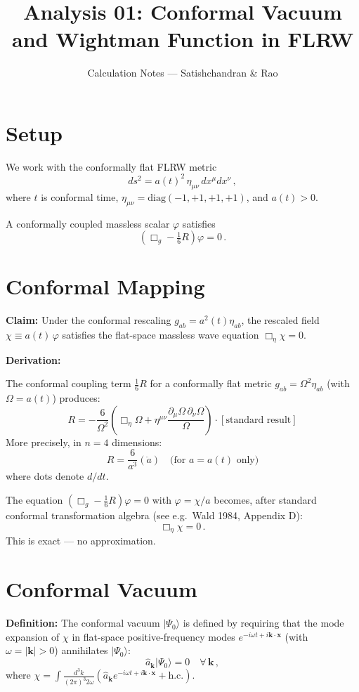 \documentclass[12pt]{article}
\title{Analysis 01: Conformal Vacuum and Wightman Function in FLRW}
\author{Calculation Notes --- Satishchandran \& Rao}
\date{}
\newcommand{\Scfac}{a}
\newcommand{\pd}{\partial}
\newcommand{\be}{\begin{equation}}
\newcommand{\ee}{\end{equation}}
\newcommand{\lb}{\left}
\newcommand{\rb}{\right}
\begin{document}
\maketitle

\section{Setup}

We work with the conformally flat FLRW metric
\be
  ds^2 = \Scfac(t)^2 \, \eta_{\mu\nu} \, dx^\mu dx^\nu \,,
\ee
where $t$ is conformal time, $\eta_{\mu\nu} = \mathrm{diag}(-1,+1,+1,+1)$,
and $\Scfac(t) > 0$.

A conformally coupled massless scalar $\varphi$ satisfies
\be
  \lb(\Box_g - \tfrac{1}{6} R\rb) \varphi = 0 \,.
\ee

\section{Conformal Mapping}

\textbf{Claim:} Under the conformal rescaling $g_{ab} = \Scfac^2(t) \eta_{ab}$,
the rescaled field $\chi \equiv \Scfac(t) \, \varphi$ satisfies the flat-space
massless wave equation $\Box_\eta \chi = 0$.

\textbf{Derivation:}

The conformal coupling term $\frac{1}{6}R$ for a conformally flat metric
$g_{ab} = \Omega^2 \eta_{ab}$ (with $\Omega = \Scfac(t)$) produces:
\be
  R = -\frac{6}{\Omega^2} \lb(\Box_\eta \Omega + \eta^{\mu\nu} \frac{\pd_\mu \Omega \, \pd_\nu \Omega}{\Omega}\rb) \cdot [\text{standard result}]
\ee
More precisely, in $n=4$ dimensions:
\be
  R = \frac{6}{\Scfac^3} \lb(\ddot{\Scfac}\rb) \quad \text{(for $\Scfac = \Scfac(t)$ only)}
\ee
where dots denote $d/dt$.

The equation $(\Box_g - \frac{1}{6}R)\varphi = 0$ with $\varphi = \chi/\Scfac$ becomes,
after standard conformal transformation algebra (see e.g.\ Wald 1984, Appendix D):
\be
  \Box_\eta \chi = 0 \,.
\ee
This is exact --- no approximation.

\section{Conformal Vacuum}

\textbf{Definition:} The conformal vacuum $|\Psi_0\rangle$ is defined by
requiring that the mode expansion of $\chi$ in flat-space positive-frequency
modes $e^{-i\omega t + i\mathbf{k}\cdot\mathbf{x}}$ (with $\omega = |\mathbf{k}| > 0$)
annihilates $|\Psi_0\rangle$:
\be
  \hat{a}_{\mathbf{k}} |\Psi_0\rangle = 0 \quad \forall \, \mathbf{k}\,,
\ee
where $\chi = \int \frac{d^3k}{(2\pi)^3 2\omega} \lb(\hat{a}_\mathbf{k} e^{-i\omega t + i\mathbf{k}\cdot\mathbf{x}} + \text{h.c.}\rb)$.
\end{document}
